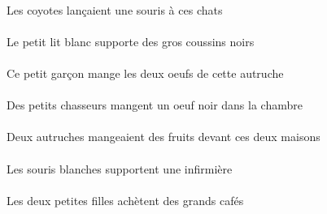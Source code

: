 \begin{exe}
\DEFPlErgP{}   \coyoteAPlErgP{}    \DEMPlDatP{}   \chatDPlDatP{}   \INDSgAbsP{}   \sourisASgAbsP{}  \lancerVdPstASgP{}\\
Les coyotes lançaient une souris à ces chats
\ex\gll
\DEFSgErg{}   \petitDSg{}   \blancDSg{}   \litDSgErg{}   \INDPlAbs{}   \grosAPl{}   \noirAPl{}   \coussinAPlAbs{}  \supporterVtPrsAPl{}\\
\DEFSgErgP{}   \petitDSgP{}   \blancDSgP{}   \litDSgErgP{}   \INDPlAbsP{}   \grosAPlP{}   \noirAPlP{}   \coussinAPlAbsP{}  \supporterVtPrsAPlP{}\\
Le petit lit blanc supporte des gros coussins noirs
\ex\gll
\DEMSgErg{}   \petitBSg{}   \garconBSgErg{}   \DEFDuAbs{}    \DEMSgObl{}   \autrucheDSgObl{}   \DE{}   \oeufDDuAbs{}  \mangerVtPrsDDu{}\\
\DEMSgErgP{}   \petitBSgP{}   \garconBSgErgP{}   \DEFDuAbsP{}    \DEMSgOblP{}   \autrucheDSgOblP{}   \DEP{}   \oeufDDuAbsP{}  \mangerVtPrsDDuP{}\\
Ce petit garçon mange les deux oeufs de cette autruche
\ex\gll
\DEFSgObl{}   \chambreBSgObl{}   \DANS{}   \INDPlErg{}   \petitCPl{}   \chasseurCPlErg{}   \INDSgAbs{}   \noirDSg{}   \oeufDSgAbs{}  \mangerVtPrsDSg{}\\
\DEFSgOblP{}   \chambreBSgOblP{}   \DANSP{}   \INDPlErgP{}   \petitCPlP{}   \chasseurCPlErgP{}   \INDSgAbsP{}   \noirDSgP{}   \oeufDSgAbsP{}  \mangerVtPrsDSgP{}\\
Des petits chasseurs mangent un oeuf noir dans la chambre
\ex\gll
\DEMDuObl{}   \maisonDDuObl{}   \DEVANT{}   \INDDuErg{}   \autrucheDDuErg{}   \INDPlAbs{}   \fruitBPlAbs{}  \mangerVtPstBPl{}\\
\DEMDuOblP{}   \maisonDDuOblP{}   \DEVANTP{}   \INDDuErgP{}   \autrucheDDuErgP{}   \INDPlAbsP{}   \fruitBPlAbsP{}  \mangerVtPstBPlP{}\\
Deux autruches mangeaient des fruits devant ces deux maisons
\ex\gll
\DEFPlErg{}   \blancAPl{}   \sourisAPlErg{}   \INDSgAbs{}   \infirmiereBSgAbs{}  \supporterVtPrsBSg{}\\
\DEFPlErgP{}   \blancAPlP{}   \sourisAPlErgP{}   \INDSgAbsP{}   \infirmiereBSgAbsP{}  \supporterVtPrsBSgP{}\\
Les souris blanches supportent une infirmière
\ex\gll
\DEFDuErg{}   \petitCDu{}   \filleCDuErg{}   \INDPlAbs{}   \grandDPl{}   \cafeDPlAbs{}  \acheterVtPrsDPl{}\\
\DEFDuErgP{}   \petitCDuP{}   \filleCDuErgP{}   \INDPlAbsP{}   \grandDPlP{}   \cafeDPlAbsP{}  \acheterVtPrsDPlP{}\\
Les deux petites filles achètent des grands cafés

\end{exe}
